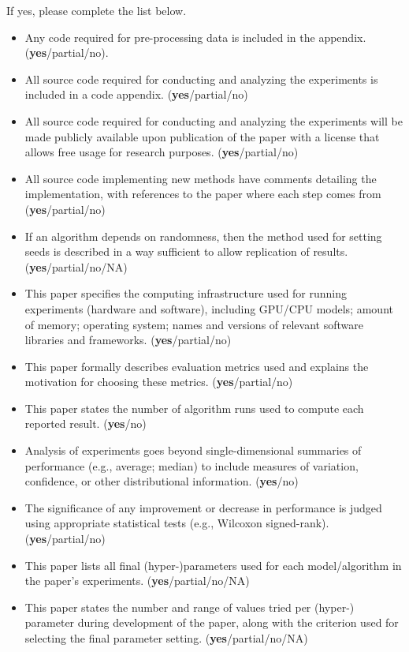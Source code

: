\documentclass[letterpaper]{article} %
\begin{document}
If yes, please complete the list below.
\begin{itemize}
\item
Any code required for pre-processing data is included in the appendix. (\textbf{yes}/partial/no).
\item
All source code required for conducting and analyzing the experiments is included in a code appendix. (\textbf{yes}/partial/no)
    \item
All source code required for conducting and analyzing the experiments will be made publicly available upon publication of the paper with a license that allows free usage for research purposes. (\textbf{yes}/partial/no)
\item
All source code implementing new methods have comments detailing the implementation, with references to the paper where each step comes from (\textbf{yes}/partial/no)
\item
If an algorithm depends on randomness, then the method used for setting seeds is described in a way sufficient to allow replication of results. (\textbf{yes}/partial/no/NA)
\item
This paper specifies the computing infrastructure used for running experiments (hardware and software), including GPU/CPU models; amount of memory; operating system; names and versions of relevant software libraries and frameworks. (\textbf{yes}/partial/no)
\item
This paper formally describes evaluation metrics used and explains the motivation for choosing these metrics. (\textbf{yes}/partial/no)
\item
This paper states the number of algorithm runs used to compute each reported result. (\textbf{yes}/no)
\item
Analysis of experiments goes beyond single-dimensional summaries of performance (e.g., average; median) to include measures of variation, confidence, or other distributional information. (\textbf{yes}/no)
\item
The significance of any improvement or decrease in performance is judged using appropriate statistical tests (e.g., Wilcoxon signed-rank). (\textbf{yes}/partial/no)
\item
This paper lists all final (hyper-)parameters used for each model/algorithm in the paper’s experiments. (\textbf{yes}/partial/no/NA)
\item
This paper states the number and range of values tried per (hyper-) parameter during development of the paper, along with the criterion used for selecting the final parameter setting. (\textbf{yes}/partial/no/NA)
\end{itemize}
\end{document}
